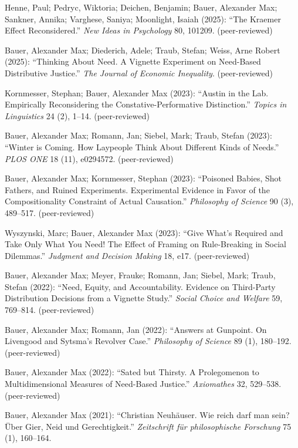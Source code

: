 \documentclass[a4paper,10pt]{article}
\newenvironment{literature}{%
   \parskip6pt\parindent0pt\raggedright
   \def\lititem{\hangindent=1cm\hangafter1}}{%
   \par\ignorespaces}
\begin{document}
\begin{literature}
\lititem Henne, Paul; Pedryc, Wiktoria; Deichen, Benjamin; Bauer, Alexander Max; Sankner, Annika; Varghese, Saniya; Moonlight, Isaiah (2025): \enquote{The Kraemer Effect Reconsidered.} \textit{New Ideas in Psychology} 80, 101209. (peer-reviewed)

\lititem Bauer, Alexander Max; Diederich, Adele; Traub, Stefan; Weiss, Arne Robert (2025): \enquote{Thinking About Need. A Vignette Experiment on Need-Based Distributive Justice.} \textit{The Journal of Economic Inequality}. (peer-reviewed)

\lititem Kornmesser, Stephan; Bauer, Alexander Max (2023): \enquote{Austin in the Lab. Empirically Reconsidering the Constative-Performative Distinction.} \textit{Topics in Linguistics} 24 (2), 1--14. (peer-reviewed)

\lititem Bauer, Alexander Max; Romann, Jan; Siebel, Mark; Traub, Stefan (2023): \enquote{Winter is Coming. How Laypeople Think About Different Kinds of Needs.} \textit{PLOS ONE} 18 (11), e0294572. (peer-reviewed)

\lititem Bauer, Alexander Max; Kornmesser, Stephan (2023): \enquote{Poisoned Babies, Shot Fathers, and Ruined Experiments. Experimental Evidence in Favor of the Compositionality Constraint of Actual Causation.} \textit{Philosophy of Science} 90 (3), 489--517. (peer-reviewed)

\lititem Wyszynski, Marc; Bauer, Alexander Max (2023): \enquote{Give What's Required and Take Only What You Need! The Effect of Framing on Rule-Breaking in Social Dilemmas.} \textit{Judgment and Decision Making} 18, e17. (peer-reviewed)

\lititem Bauer, Alexander Max; Meyer, Frauke; Romann, Jan; Siebel, Mark; Traub, Stefan (2022): \enquote{Need, Equity, and Accountability. Evidence on Third-Party Distribution Decisions from a Vignette Study.} \textit{Social Choice and Welfare} 59, 769--814. (peer-reviewed)

\lititem Bauer, Alexander Max; Romann, Jan (2022): \enquote{Answers at Gunpoint. On Livengood and Sytsma's Revolver Case.} \textit{Philosophy of Science} 89 (1), 180--192. (peer-reviewed)

\lititem Bauer, Alexander Max (2022): \enquote{Sated but Thirsty. A Prolegomenon to Multidimensional Measures of Need-Based Justice.} \textit{Axiomathes} 32, 529--538. (peer-reviewed)

\lititem Bauer, Alexander Max (2021): \enquote{Christian Neuhäuser. Wie reich darf man sein? Über Gier, Neid und Gerechtigkeit.} \textit{Zeitschrift für philosophische Forschung} 75 (1), 160--164.


\end{literature}
\end{document}
